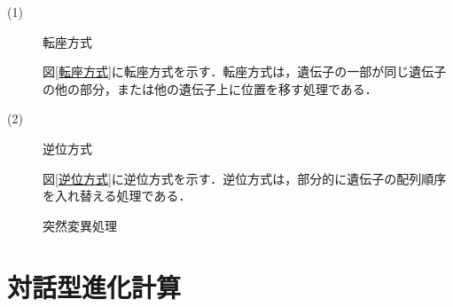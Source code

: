 \begin{description}

\item[ (1) ]転座方式

図\ref{転座方式}に転座方式を示す．転座方式は，遺伝子の一部が同じ遺伝子の他の部分，または他の遺伝子上に位置を移す処理である．

\item[ (2) ]逆位方式


図\ref{逆位方式}に逆位方式を示す．逆位方式は，部分的に遺伝子の配列順序を入れ替える処理である．


\end{description}

\begin{figure}[hbt]
\centering
{}



\caption{突然変異処理}
\label{fig:2.3}
\end{figure}


\newpage

\section{対話型進化計算}
\label{sec2.2}

